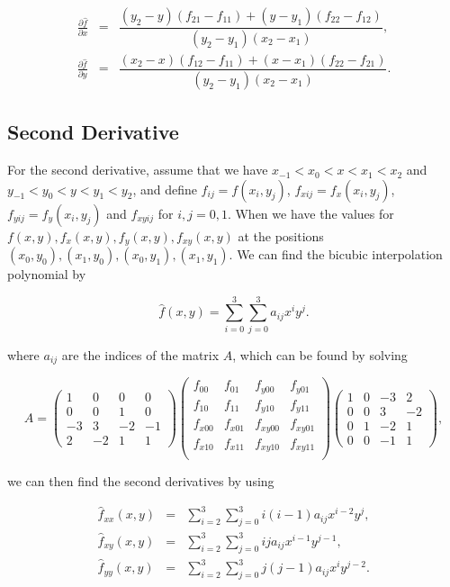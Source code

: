 $$
\begin{array}{lcl} 
    \frac{\partial\hat{f}}{\partial x} & = & \dfrac{(y_2-y)(f_{21}-f_{11}) + (y-y_1)(f_{22}- f_{12})}{(y_2-y_1)(x_2-x_1)}, \\
    \frac{\partial\hat{f}}{\partial y} & = & \dfrac{(x_2-x)(f_{12}-f_{11}) + (x-x_1)(f_{22}-f_{21})}{(y_2-y_1)(x_2-x_1)}.
\end{array}
$$

\subsection{Second Derivative}
\label{subsec: second derivative}
For the second derivative, assume that we have $x_{-1} < x_0 < x < x_1 < x_2$ and $y_{-1} < y_0 < y < y_1 < y_2$, and define $f_{ij} = f(x_i, y_j)$, $f_{xij} = f_x(x_i,y_j)$, $f_{yij} = f_y(x_i,y_j)$ and $f_{xyij}$ for $i,j = 0, 1$. When we have the values for $f(x,y), f_x(x,y), f_y(x,y), f_{xy}(x,y)$ at the positions $(x_0, y_0), (x_1, y_0), (x_0, y_1), (x_1, y_1)$. We can find the bicubic interpolation polynomial by

$$
\hat{f}(x,y) = \sum_{i=0}^3 \sum_{j=0}^3 a_{ij}x^i y^j.
$$

where $a_{ij}$ are the indices of the matrix $A$, which can be found by solving

$$
A = \begin{pmatrix}
    1&0&0&0 \\
    0&0&1&0 \\
    -3&3&-2&-1 \\
    2&-2&1&1
\end{pmatrix} \begin{pmatrix}
    f_{00}&f_{01}&f_{y00}&f_{y01} \\
    f_{10}&f_{11}&f_{y10}&f_{y11} \\
    f_{x00}&f_{x01}&f_{xy00}&f_{xy01} \\
    f_{x10}&f_{x11}&f_{xy10}&f_{xy11} \\
\end{pmatrix} \begin{pmatrix}
    1&0&-3&2 \\
    0&0&3&-2 \\
    0&1&-2&1 \\
    0&0&-1&1
\end{pmatrix},
$$


we can then find the second derivatives by using


$$
\begin{array}{rcl}
    \hat{f}_{xx}(x,y) & = & \sum_{i=2}^3 \sum_{j=0}^3 i (i-1) a_{ij}x^{i-2} y^j, \\
    \hat{f}_{xy}(x,y) & = & \sum_{i=2}^3 \sum_{j=0}^3 i j a_{ij}x^{i-1} y^{j-1}, \\
    \hat{f}_{yy}(x,y) & = & \sum_{i=2}^3 \sum_{j=0}^3 j (j-1) a_{ij}x^{i} y^{j-2}.
\end{array}
$$

